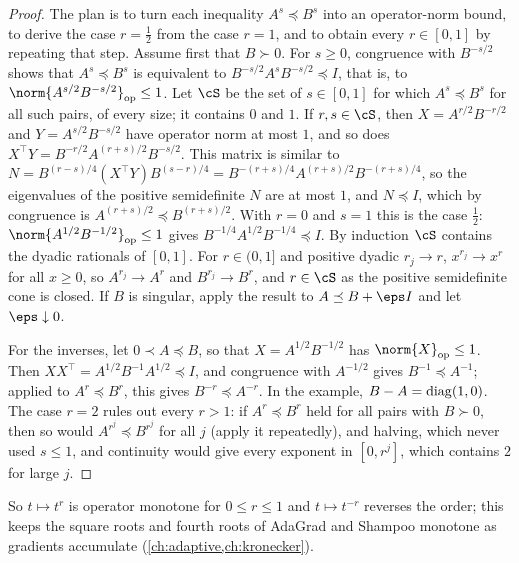 \begin{refsection}
\begin{proof}
The plan is to turn each inequality $A^s\preceq B^s$ into an operator-norm bound, to derive the case $r=\frac12$ from the case $r=1$, and to obtain every $r\in[0,1]$ by repeating that step. Assume first that $B\succ0$. For $s\ge0$, congruence with $B^{-s/2}$ shows that $A^s\preceq B^s$ is equivalent to $B^{-s/2}A^sB^{-s/2}\preceq I$, that is, to $\norm{A^{s/2}B^{-s/2}}_{\op}\le1$. Let $\cS$ be the set of $s\in[0,1]$ for which $A^s\preceq B^s$ for all such pairs, of every size; it contains $0$ and $1$. If $r,s\in\cS$, then $X=A^{r/2}B^{-r/2}$ and $Y=A^{s/2}B^{-s/2}$ have operator norm at most $1$, and so does $X^\top Y=B^{-r/2}A^{(r+s)/2}B^{-s/2}$. This matrix is similar to $N=B^{(r-s)/4}(X^\top Y)B^{(s-r)/4}=B^{-(r+s)/4}A^{(r+s)/2}B^{-(r+s)/4}$, so the eigenvalues of the positive semidefinite $N$ are at most $1$, and $N\preceq I$, which by congruence is $A^{(r+s)/2}\preceq B^{(r+s)/2}$. With $r=0$ and $s=1$ this is the case $\frac12$: $\norm{A^{1/2}B^{-1/2}}_{\op}\le1$ gives $B^{-1/4}A^{1/2}B^{-1/4}\preceq I$. By induction $\cS$ contains the dyadic rationals of $[0,1]$. For $r\in(0,1]$ and positive dyadic $r_j\to r$, $x^{r_j}\to x^r$ for all $x\ge0$, so $A^{r_j}\to A^r$ and $B^{r_j}\to B^r$, and $r\in\cS$ as the positive semidefinite cone is closed. If $B$ is singular, apply the result to $A\preceq B+\eps I$ and let $\eps\downarrow0$.

For the inverses, let $0\prec A\preceq B$, so that $X=A^{1/2}B^{-1/2}$ has $\norm{X}_{\op}\le1$. Then $XX^\top=A^{1/2}B^{-1}A^{1/2}\preceq I$, and congruence with $A^{-1/2}$ gives $B^{-1}\preceq A^{-1}$; applied to $A^r\preceq B^r$, this gives $B^{-r}\preceq A^{-r}$. In the example, $B-A=\operatorname{diag}(1,0)$. The case $r=2$ rules out every $r>1$: if $A^r\preceq B^r$ held for all pairs with $B\succ0$, then so would $A^{r^j}\preceq B^{r^j}$ for all $j$ (apply it repeatedly), and halving, which never used $s\le1$, and continuity would give every exponent in $[0,r^j]$, which contains $2$ for large $j$.
\end{proof}

So $t\mapsto t^r$ is operator monotone for $0\le r\le1$ and $t\mapsto t^{-r}$ reverses the order; this keeps the square roots and fourth roots of AdaGrad and Shampoo monotone as gradients accumulate (\cref{ch:adaptive,ch:kronecker}).


\end{refsection}
